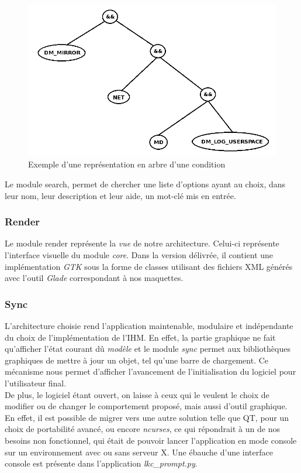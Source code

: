 ﻿\documentclass[17pts]{report}
\begin{document}
\begin{figure}[H]
    \includegraphics[scale=0.5]{illustrations/condition_tree.png}
    \centering
    \caption{Exemple d'une représentation en arbre d'une condition}
    \label{fig:condTree}
\end{figure}

Le module search, permet de chercher une liste d'options ayant au choix, dans
leur nom, leur description et leur aide, un mot-clé mis en entrée.

\subsubsection{Render}
\label{ssub:Render}
Le module render représente la \textit{vue} de notre architecture.  Celui-ci
représente l'interface visuelle du module \textit{core}.  Dans la version
délivrée, il contient une implémentation \textit{GTK} sous la forme de classes
utilisant des fichiers XML générés avec l'outil \textit{Glade} correspondant à
nos maquettes.

\subsubsection{Sync}
\label{ssub:Sync}
L'architecture choisie rend l'application maintenable, modulaire et
indépendante du choix de l'implémentation de l'IHM. En effet, la partie
graphique ne fait qu'afficher l'état courant dû \textit{modèle} et le module
\textit{sync} permet aux bibliothèques graphiques de mettre à jour un objet,
tel qu'une barre de chargement. Ce mécanisme nous permet d'afficher
l'avancement de l'initialisation du logiciel pour l'utilisateur final.  \\

De plus, le logiciel étant ouvert, on laisse à ceux qui le veulent le choix de
modifier ou de changer le comportement proposé, mais aussi d'outil graphique.
En effet, il est possible de migrer vers une autre solution telle que QT, pour
un choix de portabilité avancé,  ou encore \textit{ncurses}, ce qui répondrait
à un de nos besoins non fonctionnel, qui était de pouvoir lancer l'application
en mode console sur un environnement avec ou sans serveur X.  Une ébauche d'une
interface console est présente dans l'application \textit{lkc\_prompt.py}. \\
\end{document}
